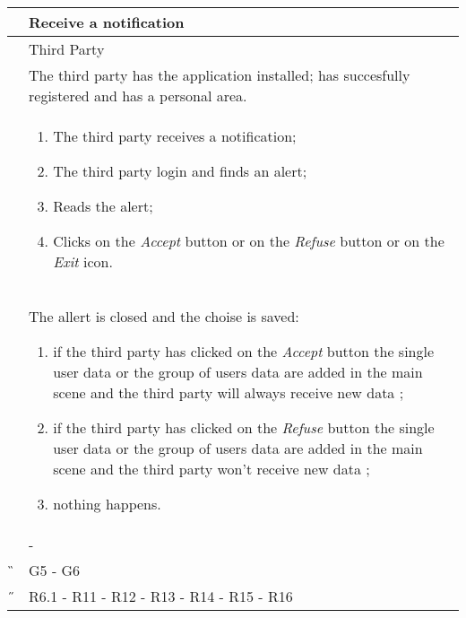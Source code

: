 \begin{center}
	\begin{longtable}{ | p{} | p{} | }
		\hline
		 \A &   Receive a notification\\ 

		\hline
		 \B &  Third Party \\ 

		\hline
  		 \C &  The third party has the application installed; has succesfully registered and has a personal area.\\ 

		\hline
		\D & \begin{enumerate}
			\item The third party receives a notification;
			\item The third party login and finds an alert;
			\item Reads the alert;
			\item Clicks on the \textit{Accept} button or on the \textit{Refuse} button or on the \textit{Exit} icon.
		\end{enumerate} \\

		\hline
		\E & The allert is closed and the choise is saved: \begin{enumerate}
			\item if the third party  has clicked on the \textit{Accept} button the single user data or the group of users data are 				added in the main scene and the third party will always receive new data ;					
			\item  if the third party  has clicked on the \textit{Refuse} button the single user data or the group of users data are 				added in the main scene and the third party won't receive new data ;	
			\item nothing happens.
		\end{enumerate}\\

		\hline
		\F & -\\
		\hline
		\G & G5 - G6\\

		\hline
		\H & R6.1 - R11 - R12 - R13 - R14 - R15 - R16\\
		\hline

	\end{longtable}
\end{center}